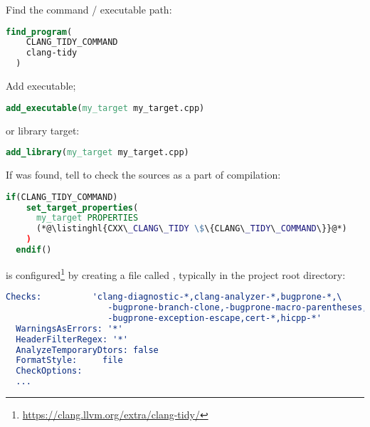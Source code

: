 \documentclass[compress,table,xcolor=table]{beamer}
\begin{document}
\begin{frame}[fragile]
  \Large
  Find the  command / executable path:
  \begin{lstlisting}[language=cmake]
  find_program(
    CLANG_TIDY_COMMAND
    clang-tidy
  )
  \end{lstlisting}

  Add executable;
  \begin{lstlisting}[language=cmake]
  add_executable(my_target my_target.cpp)
  \end{lstlisting}

  or library target:
  \begin{lstlisting}[language=cmake]
  add_library(my_target my_target.cpp)
  \end{lstlisting}
\end{frame}
\begin{frame}[fragile]
  \Large
  If  was found, tell  to check the sources
  as a part of compilation:
  \begin{lstlisting}[language=cmake]
  if(CLANG_TIDY_COMMAND)
    set_target_properties(
      my_target PROPERTIES
      (*@\listinghl{CXX\_CLANG\_TIDY \$\{CLANG\_TIDY\_COMMAND\}}@*)
    )
  endif()
  \end{lstlisting}
\end{frame}
\begin{frame}[fragile]
  \Large
     is configured\footnote{
        \url{https://clang.llvm.org/extra/clang-tidy/}} by creating
    a file called , typically in the project
    root directory:
  \vfill
  \begin{lstlisting}[language=cmake,basicstyle=\footnotesize\ttfamily]
  Checks:          'clang-diagnostic-*,clang-analyzer-*,bugprone-*,\
                    -bugprone-branch-clone,-bugprone-macro-parentheses,\
                    -bugprone-exception-escape,cert-*,hicpp-*'
  WarningsAsErrors: '*'
  HeaderFilterRegex: '*'
  AnalyzeTemporaryDtors: false
  FormatStyle:     file
  CheckOptions:
  ...
  \end{lstlisting}
\end{frame}
\end{document}

